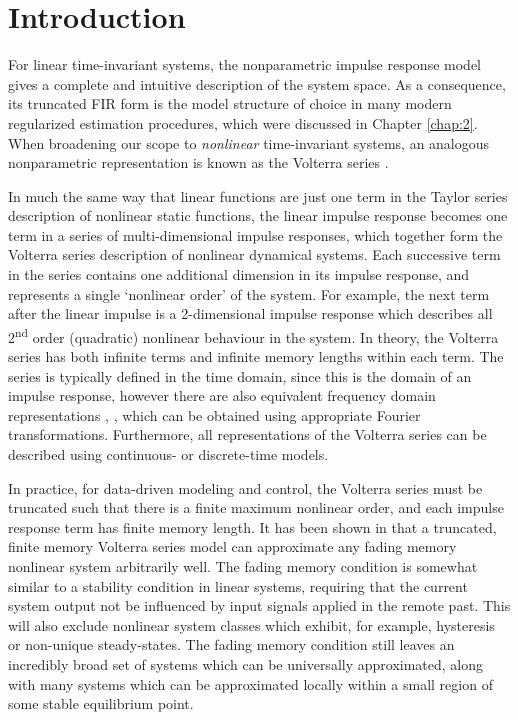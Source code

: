 \section{Introduction}

For linear time-invariant systems, the nonparametric impulse response model gives a complete and intuitive description of the system space. As a consequence, its truncated FIR form is the model structure of choice in many modern regularized estimation procedures, which were discussed in Chapter \ref{chap:2}. When broadening our scope to \emph{nonlinear} time-invariant systems, an analogous nonparametric representation is known as the Volterra series \cite{Schetzen1980}. 

In much the same way that linear functions are just one term in the Taylor series description of nonlinear static functions, the linear impulse response becomes one term in a series of multi-dimensional impulse responses, which together form the Volterra series description of nonlinear dynamical systems. Each successive term in the series contains one additional dimension in its impulse response, and represents a single `nonlinear order' of the system. For example, the next term after the linear impulse is a 2-dimensional impulse response which describes all 2\textsuperscript{nd} order (quadratic) nonlinear behaviour in the system. In theory, the Volterra series has both infinite terms and infinite memory lengths within each term. The series is typically defined in the time domain, since this is the domain of an impulse response, however there are also equivalent frequency domain representations \cite{Schetzen1980}, \cite{Lang2005}, \cite{Lang2007} which can be obtained using appropriate Fourier transformations. Furthermore, all representations of the Volterra series can be described using continuous- or discrete-time models.

In practice, for data-driven modeling and control, the Volterra series must be truncated such that there is a finite maximum nonlinear order, and each impulse response term has finite memory length. It has been shown in \cite{Boyd1985} that a truncated, finite memory Volterra series model can approximate any fading memory nonlinear system arbitrarily well. The fading memory condition is somewhat similar to a stability condition in linear systems, requiring that the current system output not be influenced by input signals applied in the remote past. This will also exclude nonlinear system classes which exhibit, for example, hysteresis or non-unique steady-states. The fading memory condition still leaves an incredibly broad set of systems which can be universally approximated, along with many systems which can be approximated locally within a small region of some stable equilibrium point.

